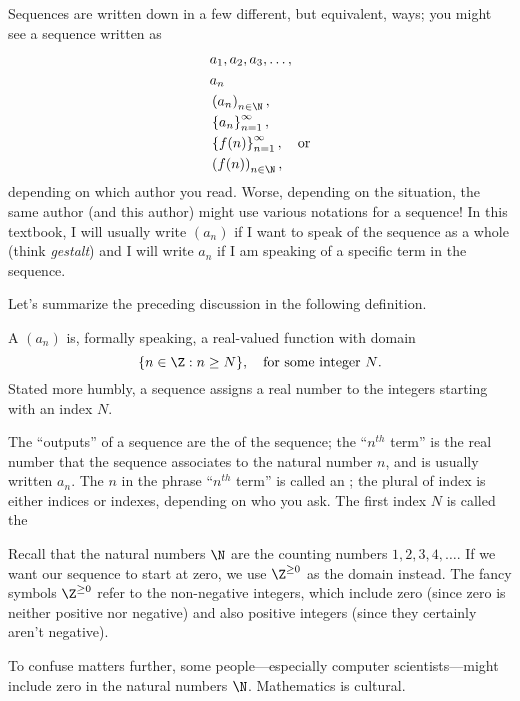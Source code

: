 \documentclass{ximera}
\begin{document}
Sequences are written down in a few different, but equivalent,
ways; you might see a sequence written as
\begin{align*}
  & a_1, a_2,  a_3, \ldots, \\
  & a_n \\
  & \left(a_n\right)_{n \in \N}, \\
  & \left\{a_n\right\}_{n=1}^\infty, \\
  & \left\{f(n)\right\}_{n=1}^\infty, \quad \mbox{or} \\
  & \left(f(n)\right)_{n \in \N},
\end{align*}
depending on which author you read.  Worse, depending on the
situation, the same author (and this author) might use various
notations for a sequence!  In this textbook, I will usually write
$(a_n)$ if I want to speak of the sequence as a whole (think
\textit{gestalt}) and I will write $a_n$ if I am speaking of a
specific term in the sequence.

Let's summarize the preceding discussion in the following definition.
\begin{definition} A 
  $(a_n)$ is, formally speaking, a real-valued function with domain
  \[
  \{ n \in \Z : n \geq N \},\quad \mbox{for some integer $N$.}
  \]
  Stated more humbly, a sequence assigns a real number to the
  integers starting with an index $N$.

  The ``outputs'' of a sequence are the  of the
  sequence; the ``$n^{th}$ term'' is the real number that the
  sequence associates to the natural number $n$, and is usually
  written $a_n$.  The $n$ in the phrase
  ``$n^{th}$ term'' is called an
  ; the plural of index is
  either indices or indexes, depending on who you ask.  The first
  index $N$ is called the 
\end{definition} 

Recall that the natural numbers $\N$ are the counting numbers $1, 2,
3, 4, \ldots$.  If we want our sequence to start at zero, we use
$\Z^{\ge 0}$ as the domain instead.  The fancy symbols $\Z^{\ge 0}$
refer to the non-negative integers, which include zero (since zero
is neither positive nor negative) and also positive integers (since
they certainly aren't negative).

To confuse matters further, some people---especially computer
scientists---might include zero in the natural numbers $\N$.
Mathematics is cultural.
\end{document}
